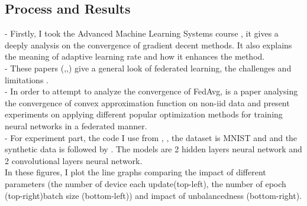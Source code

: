 \documentclass{article}
\theoremstyle{theorem}
\theoremstyle{definition}
\begin{document}
	\subsection*{Process and Results}
	- Firstly, I took the Advanced Machine Learning Systems course \cite{cite4}, it gives a deeply analysis on the convergence of gradient decent methods. It also explains the meaning of adaptive learning rate and how it enhances the method.\\
	- These papers (\cite{cite1},\cite{cite2},\cite{cite6}) give a general look of federated learning, the challenges and limitations .\\
	- In order to attempt to analyze the convergence of FedAvg,  \cite{cite5} is a paper analysing the convergence of convex approximation function on non-iid data and \cite{cite0}  present experiments on applying different popular optimization methods for training neural networks in a federated manner. \\
	- For experiment part, the code I use from \cite{cite3} , \cite{cite31}, the dataset is MNIST and and the synthetic data is followed by \cite{cite7}. The models are 2 hidden layers neural network and 2 convolutional layers neural network.\\
		In these figures, I plot the line graphs comparing the impact of different parameters (the number of device each update(top-left), the number of epoch (top-right)batch size (bottom-left)) and impact of unbalancedness (bottom-right).
\end{document}
